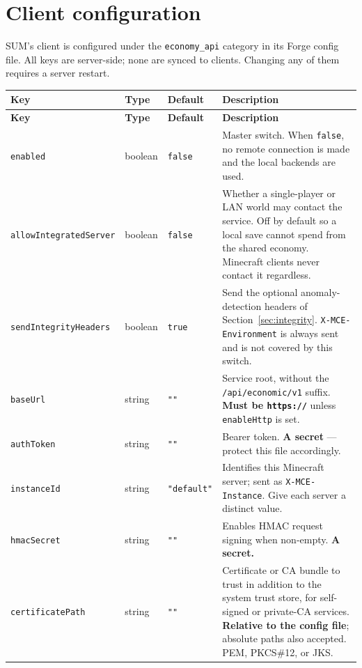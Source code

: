 \documentclass[11pt,a4paper]{article}
\newcommand{\code}[1]{\texttt{\small #1}}
\begin{document}
\section{Client configuration}
\label{sec:config}

SUM's client is configured under the \code{economy\_api} category in its Forge config file. All
keys are server-side; none are synced to clients. Changing any of them requires a server restart.

\begin{longtable}{L{4.4cm} L{1.5cm} L{1.6cm} L{6.4cm}}
\toprule
\textbf{Key} & \textbf{Type} & \textbf{Default} & \textbf{Description}\\
\midrule
\endfirsthead
\toprule
\textbf{Key} & \textbf{Type} & \textbf{Default} & \textbf{Description}\\
\midrule
\endhead
\code{enabled} & boolean & \code{false} &
  Master switch. When \code{false}, no remote connection is made and the local backends are used.\\
\code{allowIntegratedServer} & boolean & \code{false} &
  Whether a single-player or LAN world may contact the service. Off by default so a local save
  cannot spend from the shared economy. Minecraft clients never contact it regardless.\\
\code{sendIntegrityHeaders} & boolean & \code{true} &
  Send the optional anomaly-detection headers of Section~\ref{sec:integrity}.
  \code{X-MCE-Environment} is always sent and is not covered by this switch.\\
\code{baseUrl} & string & \code{""} &
  Service root, without the \code{/api/economic/v1} suffix. \textbf{Must be \code{https://}} unless \code{enableHttp} is set.\\
\code{authToken} & string & \code{""} &
  Bearer token. \textbf{A secret} --- protect this file accordingly.\\
\code{instanceId} & string & \code{"default"} &
  Identifies this Minecraft server; sent as \code{X-MCE-Instance}. Give each server a distinct value.\\
\code{hmacSecret} & string & \code{""} &
  Enables HMAC request signing when non-empty. \textbf{A secret.}\\
\code{certificatePath} & string & \code{""} &
  Certificate or CA bundle to trust in addition to the system trust store, for self-signed or
  private-CA services. \textbf{Relative to the config file}; absolute paths also accepted. PEM,
  PKCS\#12, or JKS.\\

\end{longtable}
\end{document}
